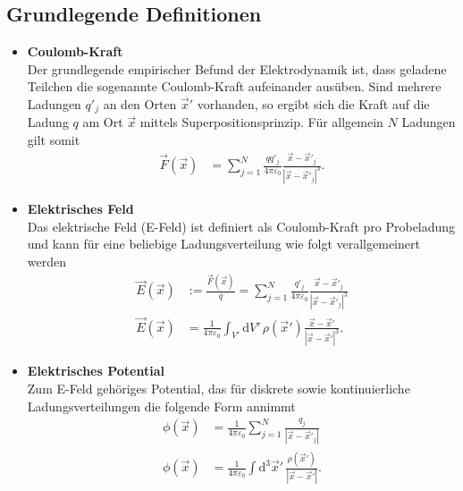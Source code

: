 \documentclass{article}
\newcommand{\diff}{\mathrm{d}}
\begin{document}
\subsection{Grundlegende Definitionen}
	\begin{itemize}
		\item \textbf{Coulomb-Kraft}\\
		Der grundlegende empirischer Befund der Elektrodynamik ist, dass geladene Teilchen die sogenannte Coulomb-Kraft aufeinander ausüben. Sind mehrere Ladungen $q'_j$ an den Orten $\vec{x}'$ vorhanden, so ergibt sich die Kraft auf die Ladung $q$ am Ort $\vec{x}$ mittels Superpositionsprinzip. Für allgemein $N$ Ladungen gilt somit
			\begin{align}
				\vec{F}(\vec{x}) &= \sum_{j=1}^N \frac{qq'_j}{4\pi\varepsilon_0} \frac{\vec{x} - \vec{x}'_j}{|\vec{x} - \vec{x}'_j|^3}.
			\end{align}
		
		\item \textbf{Elektrisches Feld}\\
		Das elektrische Feld (E-Feld) ist definiert als Coulomb-Kraft pro Probeladung und kann für eine beliebige Ladungsverteilung wie folgt verallgemeinert werden
			\begin{align}
				\vec{E}(\vec{x}) &:= \frac{\vec{F}(\vec{x})}{q} = \sum_{j=1}^N \frac{q'_j}{4\pi\varepsilon_0} \frac{\vec{x} - \vec{x}'_j}{|\vec{x} - \vec{x}'_j|^3} \\
				\vec{E}(\vec{x}) &= \frac{1}{4\pi\varepsilon_0} \int_{V'} \diff V'\, \rho(\vec{x}') \frac{\vec{x} - \vec{x}'}{|\vec{x} - \vec{x}'|^3}.
			\end{align}
		
		\item \textbf{Elektrisches Potential}\\
		Zum E-Feld gehöriges Potential, das für diskrete sowie kontinuierliche Ladungsverteilungen die folgende Form annimmt
		\begin{align}
			\phi(\vec{x}) &= \frac{1}{4\pi\varepsilon_0} \sum_{j=1}^N \frac{q_j}{|\vec{x} - \vec{x}'_j|} \\
			\phi(\vec{x}) &= \frac{1}{4\pi\varepsilon_0} \int \diff^3\vec{x}'\, \frac{\rho(\vec{x}')}{|\vec{x} - \vec{x}'|}.
		\end{align}
	
		

\end{itemize}
\end{document}
